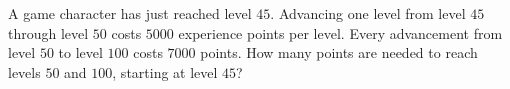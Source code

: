A game character has just reached level $45$. Advancing one level from level $45$ through level $50$ costs $5000$ experience points per level. Every advancement from level $50$ to level $100$ costs $7000$ points. How many points are needed to reach levels $50$ and $100$, starting at level $45$?
